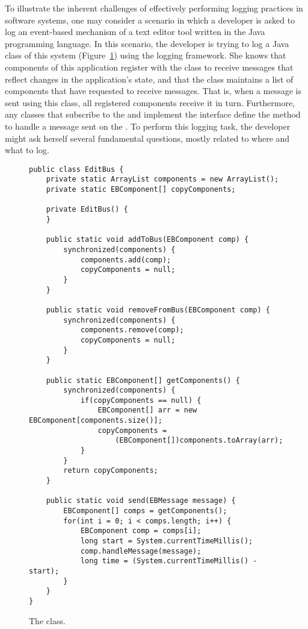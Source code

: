 To illustrate the inherent challenges of effectively performing logging practices in software systems, one may consider a scenario in which a developer is asked to log an event-based mechanism of a text editor tool written in the Java programming language. In this scenario, the developer is trying to log a Java class of this system (Figure~\ref{ch2-ex}) using the  logging framework. She knows that components of this application register with the  class to receive messages that reflect changes in the application's state, and that the  class maintains a list of components that have requested to receive messages. That is, when a message is sent using this class, all registered components receive it in turn. Furthermore, any classes that subscribe to the  and implement the  interface define the method  to handle a message sent on the . To perform this logging task, the developer might ask herself several fundamental questions, mostly related to where and what to log.


\begin{figure}[p]
\def\baselinestretch{1}
\begin{lstlisting}
public class EditBus {
    private static ArrayList components = new ArrayList();
    private static EBComponent[] copyComponents;

    private EditBus() {
    }

    public static void addToBus(EBComponent comp) {
        synchronized(components) {
            components.add(comp);
            copyComponents = null;
        }
    }

    public static void removeFromBus(EBComponent comp) {
        synchronized(components) {
            components.remove(comp);
            copyComponents = null;
        }
    }

    public static EBComponent[] getComponents() {
        synchronized(components) {
            if(copyComponents == null) {
                EBComponent[] arr = new EBComponent[components.size()];
                copyComponents =
                    (EBComponent[])components.toArray(arr);
            }
        }
        return copyComponents;
    }

    public static void send(EBMessage message) {
        EBComponent[] comps = getComponents();
        for(int i = 0; i < comps.length; i++) {
            EBComponent comp = comps[i];
            long start = System.currentTimeMillis();
            comp.handleMessage(message);
            long time = (System.currentTimeMillis() - start);
        }
    }
}
\end{lstlisting}
\caption{The  class.\label{ch2-ex}}
\end{figure}


